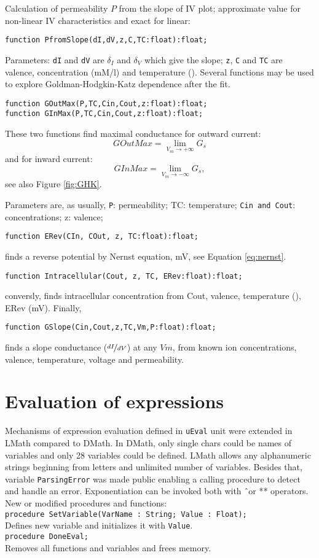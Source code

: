 \documentclass[12pt,a4paper,oneside]{article}
\newcommand{\code}[1]{\texttt{#1}}
\begin{document}
Calculation of permeability $P$ from the slope of IV plot; approximate value for non-linear IV characteristics and exact for linear: 
\begin{verbatim}
function PfromSlope(dI,dV,z,C,TC:float):float;
\end{verbatim}
Parameters: \code{dI} and \code{dV} are $\delta_I$ and $\delta_V$ which give the slope; \code{z}, \code{C} and \code{TC} are valence, concentration (mM/l) and temperature (\celsius).
Several functions may be used to explore Goldman-Hodgkin-Katz dependence after the fit.
\begin{verbatim}
function GOutMax(P,TC,Cin,Cout,z:float):float;
function GInMax(P,TC,Cin,Cout,z:float):float; 
\end{verbatim} 
These two functions find maximal conductance for outward current:
$$
GOutMax=\lim_{V_m\rightarrow+\infty}{G_s}
$$
and for inward current:
$$
GInMax=\lim_{V_m\rightarrow-\infty}{G_s},
$$
see also Figure \ref{fig:GHK}.

Parameters are, as usually, \code{P}: permeability; TC: temperature; \code{Cin and Cout}: concentrations; z: valence;
\begin{verbatim}
function ERev(CIn, COut, z, TC:float):float; 
\end{verbatim}
finds a reverse potential by Nernst equation, mV, see Equation \ref{eq:nernst}.
\begin{verbatim}
function Intracellular(Cout, z, TC, ERev:float):float;
\end{verbatim}
conversly, finds intracellular concentration from Cout, valence, temperature (\celsius), ERev (mV).
Finally, 
\begin{verbatim}
function GSlope(Cin,Cout,z,TC,Vm,P:float):float;
\end{verbatim}
finds a slope conductance ($\nicefrac{dI}{dV}$) at any $Vm$, from known ion concentrations, valence, temperature, voltage and permeability.
\section{Evaluation of expressions}
Mechanisms of expression evaluation defined in \code{uEval} unit were extended in LMath compared to DMath. In DMath, only single chars could be names of variables and only 28 variables could be defined. LMath allows any alphanumeric strings beginning from letters and unlimited number of variables. Besides that, variable \code{ParsingError} was made public enabling a calling procedure to detect and handle an error. Exponentiation can be invoked both with \^\ or ** operators.
New or modified procedures and functions:\\[2pt]
\code{procedure SetVariable(VarName : String; Value : Float);}\\
Defines new variable and initializes it with \code{Value}.\\[2pt]
\code{procedure DoneEval;}\\
Removes all functions and variables and frees memory.
\end{document}
